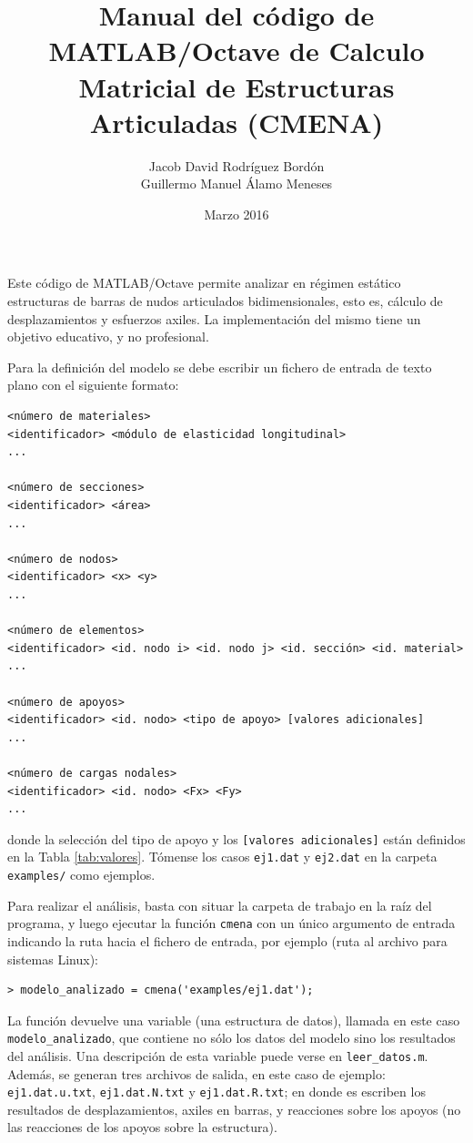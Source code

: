 \documentclass[a4paper,11pt]{article}
\title{Manual del código de MATLAB/Octave de Calculo Matricial de Estructuras Articuladas (CMENA)}
\author{Jacob David Rodr\'iguez Bord\'on \\ Guillermo Manuel \'Alamo Meneses}
\date{Marzo 2016}
\begin{document}
\maketitle

Este código de MATLAB/Octave permite analizar en régimen estático estructuras de barras de nudos articulados bidimensionales, esto es, cálculo de desplazamientos y esfuerzos axiles. La implementación del mismo tiene un objetivo educativo, y no profesional.

Para la definición del modelo se debe escribir un fichero de entrada de texto plano con el siguiente formato:
\begin{Verbatim}[frame=single,fontsize=\small]
<número de materiales>
<identificador> <módulo de elasticidad longitudinal>
...

<número de secciones>
<identificador> <área>
...

<número de nodos>
<identificador> <x> <y>
...

<número de elementos>
<identificador> <id. nodo i> <id. nodo j> <id. sección> <id. material>
...

<número de apoyos>
<identificador> <id. nodo> <tipo de apoyo> [valores adicionales]
...

<número de cargas nodales>
<identificador> <id. nodo> <Fx> <Fy>
...

\end{Verbatim}
donde la selección del tipo de apoyo y los \texttt{[valores adicionales]} están definidos en la Tabla \ref{tab:valores}. Tómense los casos \texttt{ej1.dat} y \texttt{ej2.dat} en la carpeta \texttt{examples/} como ejemplos.

Para realizar el análisis, basta con situar la carpeta de trabajo en la raíz del programa, y luego ejecutar la función \texttt{cmena} con un único argumento de entrada indicando la ruta hacia el fichero de entrada, por ejemplo (ruta al archivo para sistemas Linux):
\begin{Verbatim}[frame=single,fontsize=\small]
> modelo_analizado = cmena('examples/ej1.dat');
\end{Verbatim}
La función devuelve una variable (una estructura de datos), llamada en este caso \texttt{modelo\_analizado}, que contiene no sólo los datos del modelo sino los resultados del análisis. Una descripción de esta variable puede verse en \texttt{leer\_datos.m}. Además, se generan tres archivos de salida, en este caso de ejemplo: \texttt{ej1.dat.u.txt}, \texttt{ej1.dat.N.txt} y \texttt{ej1.dat.R.txt}; en donde es escriben los resultados de desplazamientos, axiles en barras, y reacciones sobre los apoyos (no las reacciones de los apoyos sobre la estructura).
\end{document}
